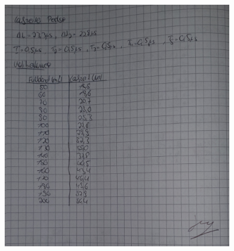 \begin{figure}
    \centering
    \includegraphics[width=0.9\textwidth]{Laborbuch2.jpg}
\end{figure}


